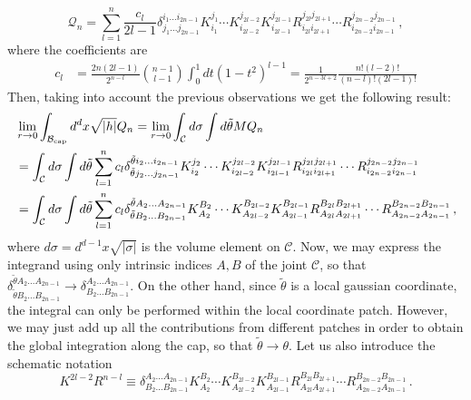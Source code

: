 \documentclass[11pt,letterpaper]{article}
\begin{document}
\begin{equation}
\mathcal{Q}_{n}=\sum_{l=1}^{n} \frac{c_l}{2l-1} \delta^{i_1\dots i_{2n-1}}_{j_1\dots j_{2n-1}}K^{j_1}_{i_1}\cdots K^{j_{2l-2}}_{i_{2l-2}}K^{j_{2l-1}}_{i_{2l-1}}R^{j_{2l} j_{2l+1}}_{i_{2l}i_{2l+1}}\cdots R^{j_{2n-2}j_{2n-1}}_{i_{2n-2}i_{2n-1}}\, ,
\label{Qterm}
\end{equation}
where the coefficients are
\begin{equation}\label{cl}
\begin{aligned}
c_l&=\frac{2n(2l-1)}{2^{n-l}}\binom{n-1}{l-1}\int_0^{1}dt(1-t^2)^{l-1}=\frac{1}{2^{n-3l+2}}\frac{n!(l-2)!}{(n-l)!(2l-1)!}
\end{aligned}
\end{equation}
Then, taking into account the previous observations we get the following result:
\begin{equation}
\begin{aligned}
&\lim_{r\rightarrow 0}\int_{\mathcal{B}_{\rm cap}}d^{d}x\sqrt{|h|}Q_{n}=\lim_{r\rightarrow 0}\int_{\mathcal{C}}d\sigma \int d\tilde\theta M Q_{n}\\
&=\int_{\mathcal{C}}d\sigma \int d\tilde\theta \sum_{l=1}^{n} c_l \delta^{\tilde\theta i_2 \dots i_{2n-1}}_{\tilde\theta j_2\dots j_{2n-1}}K^{j_2}_{i_2}\cdots K^{j_{2l-2}}_{i_{2l-2}}K^{j_{2l-1}}_{i_{2l-1}}R^{j_{2l} j_{2l+1}}_{i_{2l}i_{2l+1}}\cdots R^{j_{2n-2}j_{2n-1}}_{i_{2n-2}i_{2n-1}}\\
&=\int_{\mathcal{C}}d\sigma \int d\tilde\theta \sum_{l=1}^{n} c_l \delta^{\tilde\theta A_2 \dots A_{2n-1}}_{\tilde\theta B_2\dots B_{2n-1}}K^{B_2}_{A_2}\cdots K^{B_{2l-2}}_{A_{2l-2}}K^{B_{2l-1}}_{A_{2l-1}}R^{B_{2l} B_{2l+1}}_{A_{2l}A_{2l+1}}\cdots R^{B_{2n-2}B_{2n-1}}_{A_{2n-2}A_{2n-1}}\, ,
\end{aligned}
\end{equation}
where $d\sigma=d^{d-1}x\sqrt{|\sigma|}$ is the volume element on $\mathcal{C}$. Now, we may express the integrand using only intrinsic indices $A,B$ of the joint $\mathcal{C}$, so that $\delta^{\tilde\theta A_2 \dots A_{2n-1}}_{\tilde\theta B_2\dots B_{2n-1}}\rightarrow \delta^{A_2 \dots A_{2n-1}}_{B_2\dots B_{2n-1}}$. On the other hand, since $\tilde\theta$ is a local gaussian coordinate, the integral can only be performed within the local coordinate patch. However, we may just add up all the contributions from different patches in order to obtain the global integration along the cap, so that $\tilde\theta\rightarrow \theta$. Let us also introduce the schematic notation
\begin{equation}
K^{2l-2}R^{n-l}\equiv \delta^{A_2 \dots A_{2n-1}}_{B_2\dots B_{2n-1}}K^{B_2}_{A_2}\cdots K^{B_{2l-2}}_{A_{2l-2}}K^{B_{2l-1}}_{A_{2l-1}}R^{B_{2l} B_{2l+1}}_{A_{2l}A_{2l+1}}\cdots R^{B_{2n-2}B_{2n-1}}_{A_{2n-2}A_{2n-1}}\, .
\end{equation}
\end{document}

